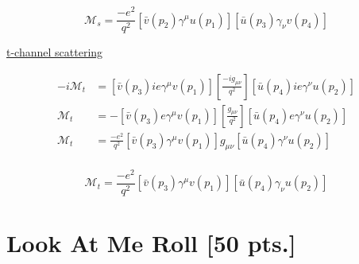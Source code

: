 \documentclass[11pt]{article}
\theoremstyle{definition}
\numberwithin{equation}{section}
\begin{document}
\begin{equation}
\boxed{
    \mathcal{M}_{s} = \frac{-e^2}{q^2} [\bar{v}(p_2)\gamma^{\mu}u(p_1)]
    [\bar{u}(p_3)\gamma_{\nu}v(p_4)]
}
\end{equation}

\underline{t-channel scattering}

\begin{align}
    -i\mathcal{M}_{t} &= [\bar{v}(p_3)ie\gamma^{\mu}v(p_1)] 
    \left[ \frac{-ig_{\mu\nu}}{q^2} \right]
    [\bar{u}(p_4)ie\gamma^{\nu}u(p_2)]\\
    \mathcal{M}_{t} &= -[\bar{v}(p_3)e\gamma^{\mu}v(p_1)] 
    \left[ \frac{g_{\mu\nu}}{q^2} \right]
    [\bar{u}(p_4)e\gamma^{\nu}u(p_2)]\\
    \mathcal{M}_{t} &= \frac{-e^2}{q^2} [\bar{v}(p_3)\gamma^{\mu}v(p_1)]
    g_{\mu\nu}[\bar{u}(p_4)\gamma^{\nu}u(p_2)]\\
\end{align}

\begin{equation}
\boxed{
    \mathcal{M}_{t} = \frac{-e^2}{q^2} [\bar{v}(p_3)\gamma^{\mu}v(p_1)]
    [\bar{u}(p_4)\gamma_{\nu}u(p_2)]
}
\end{equation}






\newpage


\section{\textbf{Look At Me Roll} [50 pts.]}

\end{document}
